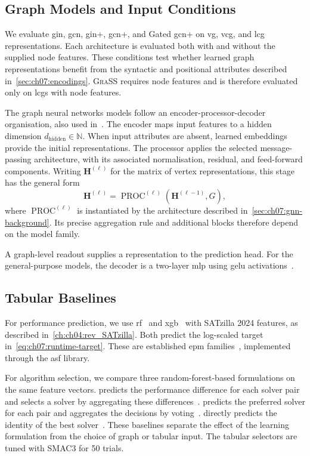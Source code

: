 \subsection{Graph Models and Input Conditions}
We evaluate \gls{gin}, \gls{gcn}, \gls{gin}+, \gls{gcn}+, and Gated \gls{gcn}+ on \gls{vg}, \gls{vcg}, and \gls{lcg} representations. Each architecture is evaluated both with and without the supplied node features. These conditions test whether learned graph representations benefit from the syntactic and positional attributes described in~\cref{sec:ch07:encodings}. \textsc{GraSS} requires node features and is therefore evaluated only on \glspl{lcg} with node features.

The graph neural networks models follow an encoder-processor-decoder organisation, also used in~\citet{BecEtAl25,StoEtAl25}. The encoder maps input features to a hidden dimension $d_{\mathrm{hidden}}\in\mathbb{N}$. When input attributes are absent, learned embeddings provide the initial representations. The processor applies the selected message-passing architecture, with its associated normalisation, residual, and feed-forward components. Writing $\mathbf{H}^{(\ell)}$ for the matrix of vertex representations, this stage has the general form
\begin{equation}
\label{eq:ch07:processor_eq}
    \mathbf{H}^{(\ell)}=\operatorname{PROC}^{(\ell)}(\mathbf{H}^{(\ell-1)},G),
\end{equation}
where $\operatorname{PROC}^{(\ell)}$ is instantiated by the architecture described in~\cref{sec:ch07:gnn-background}. Its precise aggregation rule and additional blocks therefore depend on the model family.

A graph-level readout supplies a representation to the prediction head. For the general-purpose models, the decoder is a two-layer \gls{mlp} using \gls{gelu} activations~\citep{HenGim16}.

\subsection{Tabular Baselines}
\label{sec:ch07:tabular-baselines}
For performance prediction, we use \gls{rf}~\citep{Breiman01b} and \Gls{xgb}~\citep{CheGue16b} with SATzilla 2024 features, as described in~\cref{ch:ch04:rev_SATzilla}. Both predict the log-scaled target in~\cref{eq:ch07:runtime-target}. These are established \gls{epm} families~\citep{BanEtAl22b,EggEtAl15b,HutEtAl14c}, implemented through the \gls{asf} library.

For algorithm selection, we compare three random-forest-based formulations on the same feature vectors.  predicts the performance difference for each solver pair and selects a solver by aggregating these differences~\citep{KerEtAl18b}.  predicts the preferred solver for each pair and aggregates the decisions by voting~\citep{XuEtAl12b,LinEtAl19c}.  directly predicts the identity of the best solver~\citep{Kotthoff13b}. These baselines separate the effect of the learning formulation from the choice of graph or tabular input. The tabular selectors are tuned with SMAC3 for 50 trials.

